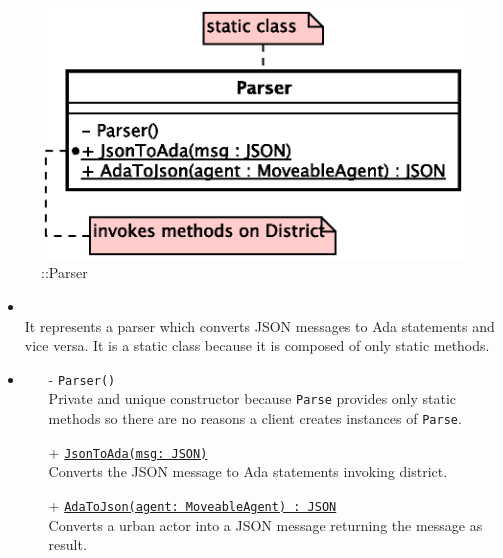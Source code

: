 \begin{figure}[h]
\centering
\includegraphics[scale=0.6,keepaspectratio]{images/solution/app/backend/parser.eps}
\caption{\pInterface::Parser}
\label{fig:sd-app-parser}
\end{figure}
\FloatBarrier
\begin{itemize}
  \item \textbf{\descr} \\
    It represents a parser which converts JSON messages to Ada statements and vice versa.
    It is a static class because it is composed of only static methods.
  \item \textbf{\ops}
  \begin{itemize}
   \item[-] \texttt{Parser()} \\
   Private and unique constructor because \texttt{Parse} provides only static methods 
   so there are no reasons a client creates instances of \texttt{Parse}.
    \item[+] \texttt{\underline{JsonToAda(msg: JSON)}} \\
    Converts the JSON message to Ada statements invoking district.
    \item[+] \texttt{\underline{AdaToJson(agent: MoveableAgent) : JSON}} \\
    Converts a urban actor into a JSON message returning the message as result.
  \end{itemize}
\end{itemize}
